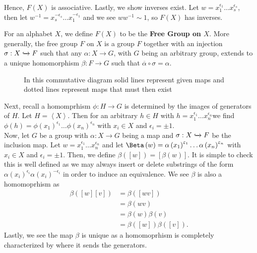 Hence, \(F\left( X \right) \) is associative. Lastly, we show inverses exist. Let \(w = x_1^{\epsilon_1} \ldots x_{s}^{\epsilon_{s}}\), then let \(w^{-1} = x_{s}^{-\epsilon_{s}} \ldots x_1^{-\epsilon_1}\) and we see \(w w^{-1} \sim 1\), so \(F\left( X \right) \) has inverses.
\begin{definition}
	For an alphabet \(X\), we define \(F\left( X \right) \) to be the \textbf{Free Group on \(X\)}. More generally, the free group \(F\) on \(X\) is a group \(F\) together with an injection \(\sigma: X \xhookrightarrow{} F\) such that any \(\alpha: X \to G\), with \(G\) being an arbitrary group, extends to a unique homomorphism \(\beta: F  \to G \) such that \(\overline{\alpha} \circ \sigma = \alpha\).
\end{definition}
\begin{figure}[ht]
    \centering
    \caption{In this commutative diagram solid lines represent given maps and dotted lines represent maps that must then exist}
    \label{fig:fig}
\end{figure}
Next, recall a homomprhism \(\phi : H \to G\) is determined by the images of generators of \(H\). Let \(H = \left<X \right> \). Then for an arbitrary \(h \in H\) with \(h = x_1^{\epsilon_1} \ldots x_{n}^{\epsilon _{n}}\)we find \(\phi\left( h \right)  = \phi\left( x_1 \right) ^{\epsilon_1} \ldots \phi\left( x_{n} \right) ^{\epsilon_{n}}\) with \(x_{i} \in X\) and \(\epsilon_{i} = \pm 1\).\\
Now, let \(G\) be a group with \(\alpha : X \to G\) being a map and \(\sigma:X \xhookrightarrow{} F\) be the inclusion map. Let \(w = x_1^{\epsilon_1} \ldots x_{n}^{\epsilon_{n}}\) and let \(\Beta\left( w \right) = \alpha\left( x_1 \right) ^{\epsilon_1} \ldots \alpha\left( x_{n} \right) ^{\epsilon _{n}}\) with \(x_{i} \in X\) and \(\epsilon_{i} = \pm 1\). Then, we define \(\beta \left( \left[ w \right]  \right)  = \left[ \beta \left( w \right)  \right] \). It is simple to check this is well defined as we may always insert or delete substrings of the form \(\alpha\left( x_{i} \right) ^{\epsilon_{i}} \alpha\left( x_{i} \right) ^{-\epsilon_{i}}\) in order to induce an equivalence. We see \(\beta\) is also a homomoprhism as
\begin{align*}
	\beta\left( \left[ w \right] \left[ v \right]  \right) &= \beta\left( \left[ wv \right]  \right)  \\
							       &= \beta\left( wv \right)  \\
							       &= \beta\left( w \right) \beta\left( v \right)  \\
							       &= \beta\left( \left[ w \right]  \right) \beta\left( \left[ v \right]  \right)
.\end{align*}
Lastly, we see the map \(\beta\) is unique as a homomoprhism is completely characterized by where it sends the generators.
